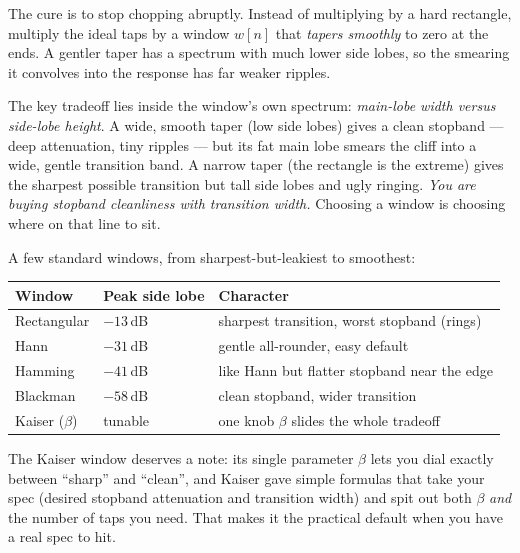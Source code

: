 The cure is to stop chopping abruptly. Instead of multiplying by a hard
rectangle, multiply the ideal taps by a window $w[n]$ that \emph{tapers smoothly}
to zero at the ends. A gentler taper has a spectrum with much lower side lobes, so
the smearing it convolves into the response has far weaker ripples.

\begin{whybox}
The key tradeoff lies inside the window's own spectrum: \emph{main-lobe
width versus side-lobe height}. A wide, smooth taper (low side lobes) gives a
clean stopband --- deep attenuation, tiny ripples --- but its fat main lobe
smears the cliff into a wide, gentle transition band. A narrow taper (the
rectangle is the extreme) gives the sharpest possible transition but tall side
lobes and ugly ringing. \emph{You are buying stopband cleanliness with transition
width.} Choosing a window is choosing where on that line to sit.
\end{whybox}

A few standard windows, from sharpest-but-leakiest to smoothest:

\begin{center}
\renewcommand{\arraystretch}{1.25}
\begin{tabular}{p{2.8cm} p{3.2cm} p{6.2cm}}
\toprule
\textbf{Window} & \textbf{Peak side lobe} & \textbf{Character} \\
\midrule
Rectangular & $-13$\,dB & sharpest transition, worst stopband (rings) \\
Hann & $-31$\,dB & gentle all-rounder, easy default \\
Hamming & $-41$\,dB & like Hann but flatter stopband near the edge \\
Blackman & $-58$\,dB & clean stopband, wider transition \\
Kaiser ($\beta$) & tunable & one knob $\beta$ slides the whole tradeoff \\
\bottomrule
\end{tabular}
\end{center}

The Kaiser window deserves a note: its single parameter $\beta$ lets you dial
exactly between ``sharp'' and ``clean'', and Kaiser gave simple formulas that take
your spec (desired stopband attenuation and transition width) and spit out both
$\beta$ \emph{and} the number of taps you need. That makes it the practical
default when you have a real spec to hit.

